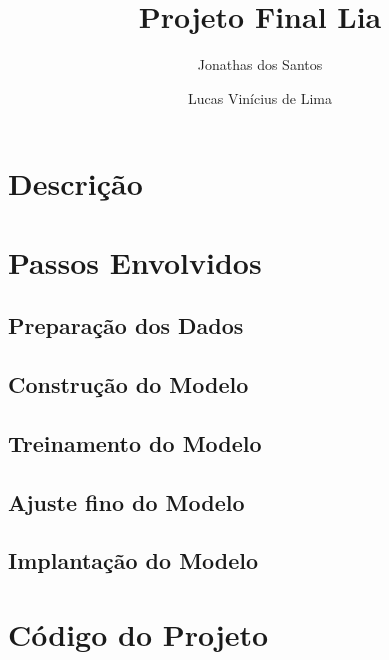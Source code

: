 \documentclass{article}
\title{Projeto Final Lia}
\author{Jonathas dos Santos \and Lucas Vinícius de Lima}
\begin{document}
    \maketitle
    
    \section{Descrição}
        \lipsum[1]

    \section{Passos Envolvidos}

    \subsection{Preparação dos Dados}
        \lipsum[1]

    \subsection{Construção do Modelo}
        \lipsum[1]

    \subsection{Treinamento do Modelo}
        \lipsum[1]

    \subsection{Ajuste fino do Modelo}
        \lipsum[1]

    \subsection{Implantação do Modelo}
        \lipsum[1]

    \section{Código do Projeto}
        \lipsum[1]
\end{document}
